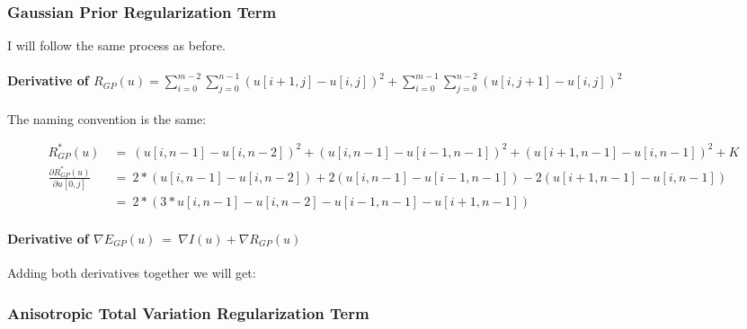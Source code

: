 \documentclass{report}
\begin{document}
			\subsubsection{Gaussian Prior Regularization Term}
			\startsubsection
				I will follow the same process as before.
				\vspace{-0.4cm} \paragraph{Derivative of $R_{GP}(u) = \sum_{i=0}^{m-2} \sum_{j=0}^{n-1} ( u[i+1,j] - u[i,j] )^2 + \sum_{i=0}^{m-1} \sum_{j=0}^{n-2} ( u[i,j+1] - u[i,j] )^2$}
				\startsubsection
					\vspace{0.2cm} The naming convention is the same:
				\closesection
				\begin{adjustwidth}{-4em}{}
					\vspace{-0.5cm}
					\begin{align*}
						R_{GP}^*(u) \ & = \ (u[i,n-1] - u[i,n-2])^2 + (u[i,n-1] - u[i-1,n-1])^2 + (u[i+1,n-1] - u[i,n-1])^2 + K \\
						\frac{\partial R_{GP}^*(u)}{\partial u[0,j]} \ & = \ 2 * (u[i,n-1] - u[i,n-2]) + 2 (u[i,n-1] - u[i-1,n-1]) - 2 (u[i+1,n-1] - u[i,n-1]) \\
						& = \ 2 * (3 * u[i,n-1] - u[i,n-2] - u[i-1,n-1] - u[i+1,n-1])
					\end{align*}
				\end{adjustwidth}
				\vspace{-0.4cm} \paragraph{Derivative of $\nabla E_{GP}(u) \ = \ \nabla I(u) + \nabla R_{GP}(u)$}
				\startsubsection
					Adding both derivatives together we will get:
				\closesection
			\closesection
			\subsubsection{Anisotropic Total Variation Regularization Term}
			\startsubsection
			\closesection
		\closesection
	\closesection
\end{document}
